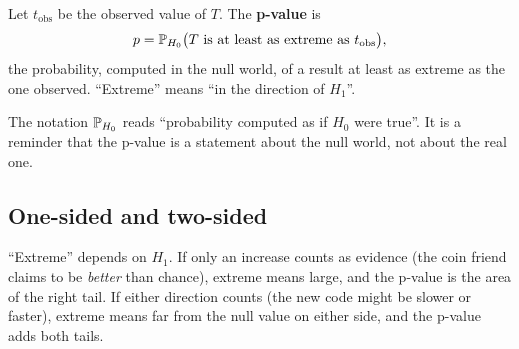 \begin{definition}[p-value]
Let $t_{\text{obs}}$ be the observed value of $T$. The \textbf{p-value} is
\[
  p = \P_{H_0}\bigl(T \text{ is at least as extreme as } t_{\text{obs}}\bigr),
\]
the probability, computed in the null world, of a result at least as extreme as the
one observed. ``Extreme'' means ``in the direction of $H_1$''.
\end{definition}

The notation $\P_{H_0}$ reads ``probability computed as if $H_0$ were true''. It is
a reminder that the p-value is a statement about the null world, not about the
real one.

\subsection{One-sided and two-sided}

``Extreme'' depends on $H_1$. If only an increase counts as evidence (the coin
friend claims to be \emph{better} than chance), extreme means large, and the p-value
is the area of the right tail. If either direction counts (the new code might be
slower or faster), extreme means far from the null value on either side, and the
p-value adds both tails.


